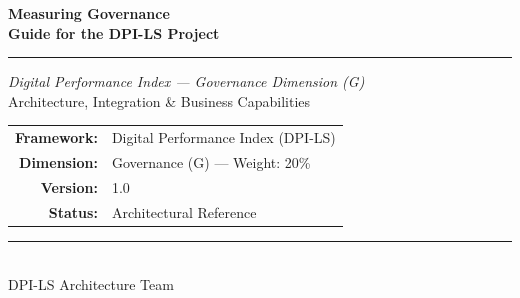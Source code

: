 \documentclass[11pt,a4paper]{article}
\begin{document}
\begin{titlepage}
    \pagecolor{dpiblue}
    \color{white}
    \begin{center}
        \vspace*{3cm}
        
        {\Huge \textbf{Measuring Governance}} \\[0.7cm]
        {\LARGE \textbf{Guide for the DPI-LS Project}}
        
        \vspace{2cm}
        
        {\color{dpicloud}\rule{0.5\textwidth}{1.5pt}}
        
        \vspace{2cm}
        
        {\Large \textit{Digital Performance Index --- Governance Dimension (G)}} \\[1cm]
        
        {\large Architecture, Integration \& Business Capabilities}
        
        \vfill
        
        
        \renewcommand{\arraystretch}{1.3}
        \begin{tabular}{rl}
            \textbf{Framework:} & Digital Performance Index (DPI-LS) \\
            \textbf{Dimension:} & Governance (G) --- Weight: 20\% \\
            \textbf{Version:} & 1.0 \\
            \textbf{Status:} & Architectural Reference \\
        \end{tabular}
        
        \vspace{2cm}
        
        {\color{dpicloud}\rule{0.5\textwidth}{1pt}} \\[0.5cm]
        
        {\large DPI-LS Architecture Team}
        
        \vspace*{1cm}
    \end{center}
\end{titlepage}
\pagecolor{white}
\color{black}
\end{document}
